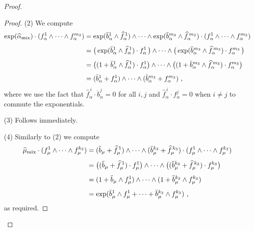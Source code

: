 \documentclass[a4paper, reqno, 11pt]{amsart}
\numberwithin{equation}{section}
\theoremstyle{definition}
\theoremstyle{remark}
\begin{document}
\begin{proof}
\begin{proof}
    \noindent (2) We compute
    \begin{equation}
    \begin{aligned}
        \exp(\widehat \alpha_{\rm mix}) \cdot ( f_\alpha^1 \wedge \cdots \wedge f_\alpha^{m_3}) &= \exp(\ddot b_\alpha^1 \wedge \widehat f_\alpha^{\,1} ) \wedge \cdots \wedge \exp(\ddot b_\alpha^{m_3} \wedge \widehat f_\alpha^{\,m_3} ) \cdot ( f_\alpha^1 \wedge \cdots \wedge f_\alpha^{m_3})\\[4pt]
        &=\big(\exp(\ddot b_\alpha^1 \wedge \widehat f_\alpha^{\,1} ) \cdot f_\alpha^1\,\big) \wedge \cdots \wedge \big(\exp(\ddot b_\alpha^{m_3} \wedge \widehat f_\alpha^{\,m_3} )\cdot f_\alpha^{m_3}\,\big) \\[4pt]
        &=\big((1+\ddot b_\alpha^1 \wedge \widehat f_\alpha^{\,1} ) \cdot f_\alpha^1 \big)\wedge \cdots \wedge \big((1+\ddot b_\alpha^{m_3} \wedge \widehat f_\alpha^{\,m_3} )\cdot f_\alpha^{m_3}\big)\\[4pt]
        &=(\ddot b_\alpha^1 + f_\alpha^1) \wedge \cdots \wedge (\ddot b_\alpha^{m_3} + f_\alpha^{m_3}) \ ,
    \end{aligned}
    \end{equation}
    where we use the fact that $\widehat f_\alpha^{\,i} \cdot \ddot b_\alpha^j = 0$ for all $i,j$ and $\widehat f_\alpha^{\,i} \cdot f_\alpha^j = 0$ when $i\neq j$ to commute the exponentials.

    \noindent (3) Follows immediately.

    \noindent (4) Similarly to (2) we compute
    \begin{equation}
    \begin{aligned}
        \widehat\mu_{\rm mix} \cdot (f_\mu^1 \wedge \cdots \wedge f_\mu^{k_3}) &= (\ddot{b}_\mu  + \widehat{f}_\mu^{\,1}) \wedge \cdots \wedge (\ddot{b}_\mu^{k_{3}} + \widehat{f}_\mu^{\,k_{3}}) \cdot (f_\mu^1 \wedge \cdots \wedge f_\mu^{k_3})\\[4pt]
        &= \big((\ddot{b}_\mu  + \widehat{f}_\mu^{\,1}) \cdot f_\mu^1\big)\wedge \cdots \wedge \big((\ddot{b}_\mu^{k_{3}} + \widehat{f}_\mu^{\,k_{3}}) \cdot f_\mu^{k_3}\big)\\[4pt]
        &= (1 + \ddot{b}_\mu\wedge  f_\mu^1)\wedge \cdots \wedge (1+ \ddot{b}_\mu^{k_{3}}\wedge f_\mu^{k_3})\\[4pt]
        &= \exp(\ddot{b}_\mu^1 \wedge f_\mu^1 + \cdots + \ddot{b}_\mu^{k_3} \wedge f_\mu^{k_3}) \ ,
    \end{aligned}
    \end{equation}
    as required.
\end{proof}


\end{proof}
\end{document}
